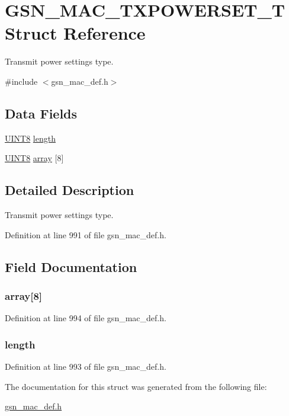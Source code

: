 \hypertarget{a00135}{
\section{GSN\_\-MAC\_\-TXPOWERSET\_\-T Struct Reference}
\label{a00135}
}


Transmit power settings type.  




{\ttfamily \#include $<$gsn\_\-mac\_\-def.h$>$}

\subsection*{Data Fields}
\begin{DoxyCompactItemize}
\item 
\hyperlink{a00660_gab27e9918b538ce9d8ca692479b375b6a}{UINT8} \hyperlink{a00135_ae360fb41f422c7c83b87d9af070cbd31}{length}
\item 
\hyperlink{a00660_gab27e9918b538ce9d8ca692479b375b6a}{UINT8} \hyperlink{a00135_a0fe2dd2e89cac0d1ce5bdd5b49302c3e}{array} \mbox{[}8\mbox{]}
\end{DoxyCompactItemize}


\subsection{Detailed Description}
Transmit power settings type. 

Definition at line 991 of file gsn\_\-mac\_\-def.h.



\subsection{Field Documentation}
\hypertarget{a00135_a0fe2dd2e89cac0d1ce5bdd5b49302c3e}{
\subsubsection[{array}]{ {\bf array}\mbox{[}8\mbox{]}}}
\label{a00135_a0fe2dd2e89cac0d1ce5bdd5b49302c3e}


Definition at line 994 of file gsn\_\-mac\_\-def.h.

\hypertarget{a00135_ae360fb41f422c7c83b87d9af070cbd31}{
\subsubsection[{length}]{ {\bf length}}}
\label{a00135_ae360fb41f422c7c83b87d9af070cbd31}


Definition at line 993 of file gsn\_\-mac\_\-def.h.



The documentation for this struct was generated from the following file:\begin{DoxyCompactItemize}
\item 
\hyperlink{a00522}{gsn\_\-mac\_\-def.h}\end{DoxyCompactItemize}
